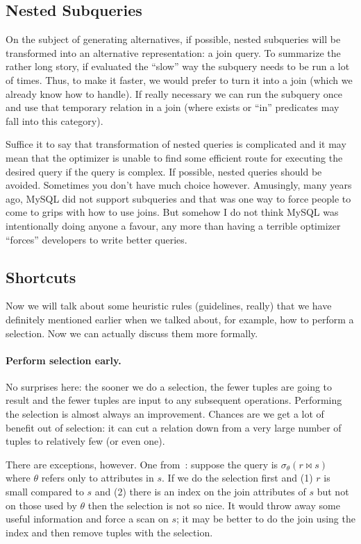 \subsection*{Nested Subqueries}

On the subject of generating alternatives, if possible, nested subqueries will be transformed into an alternative representation: a join query. To summarize the rather long story, if evaluated the ``slow'' way the subquery needs to be run a lot of times. Thus, to make it faster, we would prefer to turn it into a join (which we already know how to handle). If really necessary we can run the subquery once and use that temporary relation in a join (where exists or ``in'' predicates may fall into this category).

Suffice it to say that transformation of nested queries is complicated and it may mean that the optimizer is unable to find some efficient route for executing the desired query if the query is complex. If possible, nested queries should be avoided. Sometimes you don't have much choice however. Amusingly, many years ago, MySQL did not support subqueries and that was one way to force people to come to grips with how to use joins. But somehow I do not think MySQL was intentionally doing anyone a favour, any more than having a terrible optimizer ``forces'' developers to write better queries. 


\subsection*{Shortcuts}

Now we will talk about some heuristic rules (guidelines, really) that we have definitely mentioned earlier when we talked about, for example, how to perform a selection. Now we can actually discuss them more formally.

\paragraph{Perform selection early.} No surprises here: the sooner we do a selection, the fewer tuples are going to result and the fewer tuples are input to any subsequent operations. Performing the selection is almost always an improvement. Chances are we get a lot of benefit out of selection: it can cut a relation down from a very large number of tuples to relatively few (or even one). 

There are exceptions, however. One from~\cite{dsc}: suppose the query is $\sigma_{\theta}( r \bowtie s )$ where $\theta$ refers only to attributes in $s$. If we do the selection first and (1) $r$ is small compared to $s$ and (2) there is an index on the join attributes of $s$ but not on those used by $\theta$ then the selection is not so nice. It would throw away some useful information and force a scan on $s$; it may be better to do the join using the index and then remove tuples with the selection.

